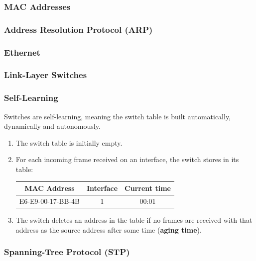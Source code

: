 \documentclass[12pt]{article}
\begin{document}
\subsubsection*{MAC Addresses}

\subsubsection*{Address Resolution Protocol (ARP)}

\subsubsection{Ethernet}

\subsubsection{Link-Layer Switches}

\subsubsection*{}

\subsubsection*{Self-Learning}

Switches are self-learning, meaning the switch table is built automatically, dynamically and autonomously.

\begin{enumerate}
    \item The switch table is initially empty.
    \item For each incoming frame received on an interface, the switch stores in its table: \\
        \begin{tabular}[t]{ | c | c | c | }
            \hline
            MAC Address & Interface & Current time \\\hline
            E6-E9-00-17-BB-4B & 1 & 00:01 \\\hline
        \end{tabular}
    \item The switch deletes an address in the table if no frames are received with that address as the source address after some time (\textbf{aging time}).
\end{enumerate}

\subsubsection*{Spanning-Tree Protocol (STP)}
\end{document}
